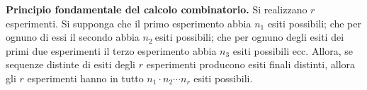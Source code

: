 \textbf{Principio fondamentale del calcolo combinatorio.} Si realizzano $r$ esperimenti. Si supponga che il primo esperimento abbia $n_{1}$ esiti possibili; che per ognuno di essi il secondo abbia $n_{2} \ $esiti possibili; che per ognuno degli esiti dei primi due esperimenti il terzo esperimento abbia $n_{3}$ esiti possibili ecc. Allora, se sequenze distinte di esiti degli $r$ esperimenti producono esiti finali distinti, allora gli $r$ esperimenti hanno in tutto $n_{1} \cdot n_{2} \cdots n_{r}$ esiti possibili.



\begin{tikzpicture}[x=0.75pt,y=0.75pt,yscale=-1,xscale=1]


\end{tikzpicture}
